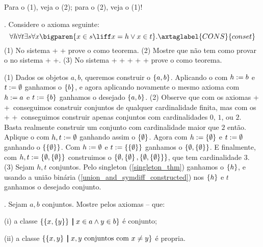 \hint
Para o (1), veja o (2); para o (2), veja o (1)!

\endproblem

\problem.
\label{conset_problem}%
Considere o axioma seguinte:
$$
\forall h
\forall t
\exists s
\forall x
\bigparen{
x \in s
\liff
x = h
\lor
x \in t
}.
\axtaglabel{CONS}{conset}
$$
(1)
No sistema
{%
+%
+}
prove o  como teorema.
\endgraf\noindent
(2)
Mostre que não tem como provar o 
no sistema
{%
+%
+}.
\endgraf\noindent
(3)
No sistema
{%
+%
+%
+%
+%
+}
prove o  como teorema.

\solution
(1)
Dados os objetos $a,b$, queremos construir o $\left\{a,b\right\}$.
Aplicando o  com $h \mathrel{:=} b$ e $t \mathrel{:=} \emptyset$
ganhamos o $\left\{b\right\}$, e agora aplicando novamente o mesmo axioma
com $h \mathrel{:=} a$ e $t \mathrel{:=} \left\{b\right\}$ ganhamos o desejado $\left\{a,b\right\}$.
\endgraf\noindent
(2)
Observe que com os axiomas
%
+%
+\ 
conseguimos construir conjuntos de qualquer cardinalidade finita,
mas com os
%
+%
+\ 
conseguimos construir apenas conjuntos com cardinalidades $0$, $1$, ou $2$.
Basta realmente construir um conjunto com cardinalidade maior que $2$ então.
Aplique o \axref{conset} com $h,t \mathrel{:=} \emptyset$ ganhando assim
o $\left\{\emptyset\right\}$.
Agora com $h \mathrel{:=} \left\{\emptyset\right\}$ e $t \mathrel{:=} \emptyset$ ganhando
o $\left\{\left\{\emptyset\right\}\right\}$.
Com $h \mathrel{:=} \emptyset$ e $t \mathrel{:=} \left\{\left\{\emptyset\right\}\right\}$
ganhamos o $\left\{\emptyset, \left\{\emptyset\right\}\right\}$.
E finalmente, com $h,t \mathrel{:=} \left\{\emptyset, \left\{\emptyset\right\}\right\}$
construimos o $\left\{\emptyset, \left\{\emptyset\right\}, \left\{\emptyset, \left\{\emptyset\right\}\right\}\right\}$,
que tem cardinalidade $3$.
\endgraf\noindent
(3)
Sejam $h, t$ conjuntos.
Pelo singleton (\ref{singleton_thm}) ganhamos o $\left\{h\right\}$,
e usando a união binária (\ref{union_and_symdiff_constructed})
nos $\left\{h\right\}$ e $t$ ganhamos o desejado conjunto.

\endproblem

\problem.
\label{one_class_set_the_other_proper_problem}%
Sejam $a,b$ conjuntos.
Mostre pelos axiomas \axref{extensionality}-- que:
\item{(i)}  a classe $\left\{ \left\{x,\left\{y\right\}\right\} \;\mathord{\pmb{\mid}}\; x \in a \land y \in b\right\}$ é conjunto;
\item{(ii)} a classe $\left\{ \left\{x,y\right\} \;\mathord{\pmb{\mid}}\; \text{$x,y$ conjuntos com $x\neq y$}\right\}$ é propria.

